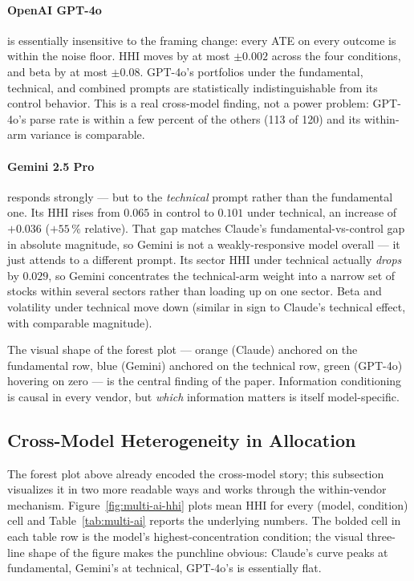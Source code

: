 \documentclass[11pt]{article}
\begin{document}
\paragraph{OpenAI GPT-4o} is essentially insensitive to the framing
change: every ATE on every outcome is within the noise floor. HHI
moves by at most $\pm 0.002$ across the four conditions, and beta by
at most $\pm 0.08$. GPT-4o's portfolios under the fundamental,
technical, and combined prompts are statistically indistinguishable
from its control behavior. This is a real cross-model finding, not a
power problem: GPT-4o's parse rate is within a few percent of the
others (113 of 120) and its within-arm variance is comparable.

\paragraph{Gemini 2.5 Pro} responds strongly --- but to the
\emph{technical} prompt rather than the fundamental one. Its HHI
rises from $0.065$ in control to $0.101$ under technical, an increase
of $+0.036$ ($+55\,\%$ relative). That gap matches Claude's
fundamental-vs-control gap in absolute magnitude, so Gemini is not a
weakly-responsive model overall --- it just attends to a different
prompt. Its sector HHI under technical actually \emph{drops} by
$0.029$, so Gemini concentrates the technical-arm weight into a narrow
set of stocks within several sectors rather than loading up on one
sector. Beta and volatility under technical move down (similar in sign
to Claude's technical effect, with comparable magnitude).

The visual shape of the forest plot --- orange (Claude) anchored on
the fundamental row, blue (Gemini) anchored on the technical row,
green (GPT-4o) hovering on zero --- is the central finding of the
paper. Information conditioning is causal in every vendor, but
\emph{which} information matters is itself model-specific.

\subsection{Cross-Model Heterogeneity in Allocation}
\label{sec:multi-ai}

The forest plot above already encoded the cross-model story; this
subsection visualizes it in two more readable ways and works through
the within-vendor mechanism. Figure~\ref{fig:multi-ai-hhi} plots mean
HHI for every (model, condition) cell and Table~\ref{tab:multi-ai}
reports the underlying numbers. The bolded cell in each table row is
the model's highest-concentration condition; the visual three-line
shape of the figure makes the punchline obvious: Claude's curve peaks
at fundamental, Gemini's at technical, GPT-4o's is essentially flat.
\end{document}
